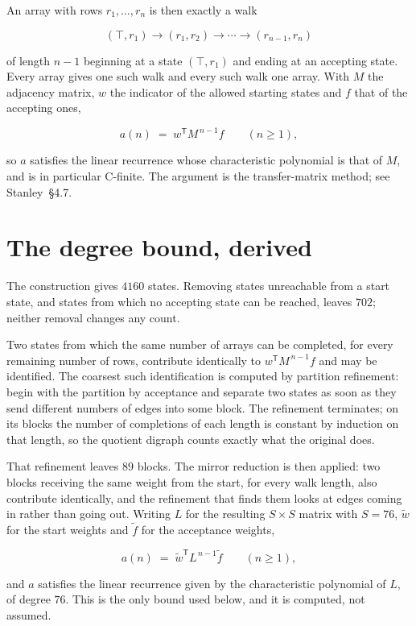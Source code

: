 \documentclass[11pt]{article}
\theoremstyle{definition}
\begin{document}
An array with rows $r_1,\dots,r_n$ is then exactly a walk

\[(\top,r_1) \to (r_1,r_2) \to \cdots \to (r_{n-1},r_n)\]

of length $n-1$ beginning at a state $(\top,r_1)$ and ending at an accepting state. Every array gives one such walk and every such walk one array. With $M$ the adjacency matrix, $w$ the indicator of the allowed starting states and $f$ that of the accepting ones,

\[a(n) \;=\; w^{\mathsf T} M^{\,n-1} f \qquad (n \ge 1),\]

so $a$ satisfies the linear recurrence whose characteristic polynomial is that of $M$, and is in particular C-finite. The argument is the transfer-matrix method; see Stanley~\S4.7.

\section{The degree bound, derived}

The construction gives $4160$ states. Removing states unreachable from a start state, and states from which no accepting state can be reached, leaves $702$; neither removal changes any count.

Two states from which the same number of arrays can be completed, for every remaining number of rows, contribute identically to $w^{\mathsf T}M^{\,n-1}f$ and may be identified. The coarsest such identification is computed by partition refinement: begin with the partition by acceptance and separate two states as soon as they send different numbers of edges into some block. The refinement terminates; on its blocks the number of completions of each length is constant by induction on that length, so the quotient digraph counts exactly what the original does.

That refinement leaves $89$ blocks. The mirror reduction is then applied: two blocks receiving the same weight from the start, for every walk length, also contribute identically, and the refinement that finds them looks at edges coming in rather than going out. Writing $L$ for the resulting $S \times S$ matrix with $S = 76$, $\tilde w$ for the start weights and $\tilde f$ for the acceptance weights,

\[a(n) \;=\; \tilde w^{\mathsf T} L^{\,n-1} \tilde f \qquad (n \ge 1),\]

and $a$ satisfies the linear recurrence given by the characteristic polynomial of $L$, of degree $76$. This is the only bound used below, and it is computed, not assumed.
\end{document}
